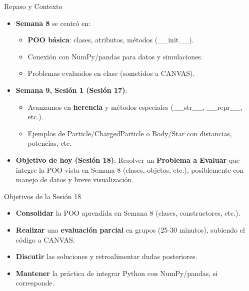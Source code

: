 \documentclass[10pt]{beamer}
\begin{document}
\begin{frame}{Repaso y Contexto}
  \begin{itemize}
    \item \textbf{Semana 8} se centró en:
      \begin{itemize}
        \item \textbf{POO básica}: clases, atributos, métodos (\_\_init\_\_).
        \item Conexión con NumPy/pandas para datos y simulaciones.
        \item Problemas evaluados en clase (sometidos a CANVAS).
      \end{itemize}
    \item \textbf{Semana 9, Sesión 1 (Sesión 17)}:
      \begin{itemize}
        \item Avanzamos en \textbf{herencia} y métodos especiales (\_\_str\_\_, \_\_repr\_\_, etc.).
        \item Ejemplos de Particle/ChargedParticle o Body/Star con distancias, potencias, etc.
      \end{itemize}
    \item \textbf{Objetivo de hoy (Sesión 18)}: Resolver un \textbf{Problema a Evaluar} que integre la POO vista en Semana 8 (clases, objetos, etc.), posiblemente con manejo de datos y breve visualización.
  \end{itemize}
\end{frame}

\begin{frame}{Objetivos de la Sesión 18}
  \begin{itemize}
    \item \textbf{Consolidar} la POO aprendida en Semana 8 (clases, constructores, etc.).
    \item \textbf{Realizar} una \textbf{evaluación parcial} en grupos (25-30 minutos), subiendo el código a CANVAS.
    \item \textbf{Discutir} las soluciones y retroalimentar dudas posteriores.
    \item \textbf{Mantener} la práctica de integrar Python con NumPy/pandas, si corresponde.
  \end{itemize}
\end{frame}
\end{document}
